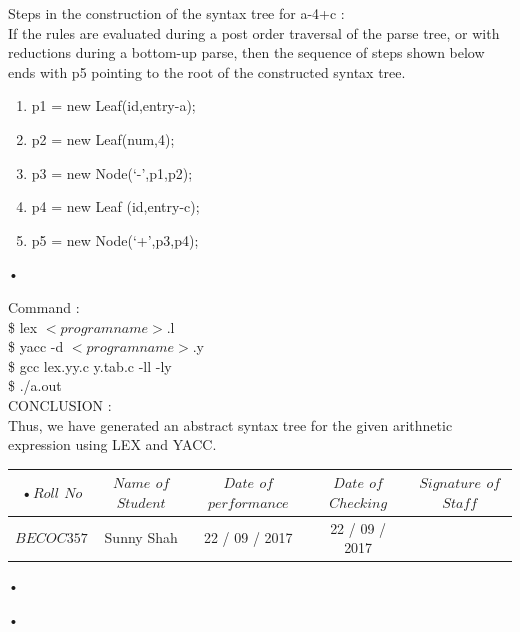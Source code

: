 \documentclass[11pt]{article}
\begin{document}
	\noindent
	Steps in the construction of the syntax tree for a-4+c :\\
	
	If the rules are evaluated during a post order traversal of the parse tree, or with reductions during a bottom-up parse, then the sequence of steps shown below ends with p5 pointing to the root of the constructed syntax tree.\\
	\begin{enumerate}
		\item p1 = new Leaf(id,entry-a);
		\item p2 = new Leaf(num,4);
		\item p3 = new Node(‘-’,p1,p2);
		\item p4 = new Leaf (id,entry-c);
		\item p5 = new Node(‘+’,p3,p4);
		
	\end{enumerate}•
	
	\noindent
	Command :\\
	\$ lex $<program name>.$l\\
	\$ yacc -d $<program name>$.y\\
	\$ gcc lex.yy.c y.tab.c -ll -ly\\
	\$ ./a.out\\
	
	\noindent
	CONCLUSION :\\
	Thus, we have generated an abstract syntax tree for the given arithnetic expression using LEX and YACC.\\
	
	\begin{center}
		\begin{tabular}{|c|c|c|c|c|}
			•$Roll$ $No$ & $Name$ $of$ $Student$ & $Date$ $of$ $performance$ & $Date$ $of$ $Checking$ & $Signature$ $of$ $Staff$ \\ \hline
			$BECOC357$ & Sunny Shah& 22 / 09 / 2017 & 22 / 09 / 2017&     \\ \hline
		\end{tabular}•
	\end{center}•
	\newpage
\end{document}
